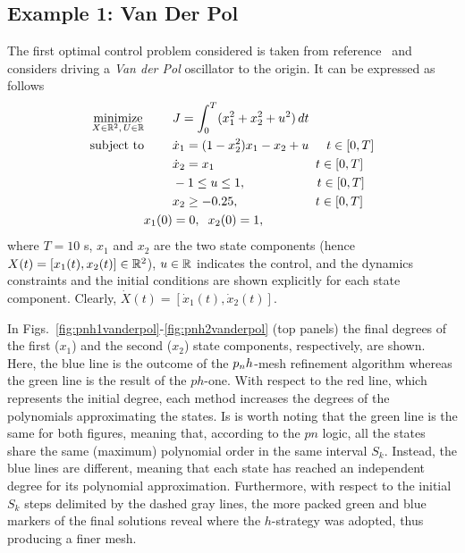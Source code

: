 \subsection*{Example 1: Van Der Pol}
The first optimal control problem considered is taken from reference~\cite{casadi:DOC:2018} and considers
driving a \emph{Van der Pol} oscillator to the origin. It can be expressed as follows
\begin{subequations}\label{eq:vanderpol}
	\begin{align}
	\underset{X \in \mathbb{R}^{2}, \, U \in \mathbb{R}}{\text{minimize}}\hspace{8mm}
	&J = \int_{0}^{T}(x_1^{2} + x_2^{2} + u^{2})\,dt  \label{eq:vancost}\\
	\text{subject to} \hspace{8mm}
	& \dot{x}_1 = (1 - x_2^{2})x_{1} - x_2 + u \hspace{5mm} t \in[0,T] \label{eq:vandyn1}\\
	& \dot{x}_2 = x_1 \hspace{28.5mm} t \in[0,T] \label{eq:vandyn2}\\
	& -1  \leq u \leq 1,  \hspace{20mm} t \in[0,T] \label{eq:vanpath1}\\
	& x_2 \geq -0.25,  \hspace{21.5mm} t \in[0,T] \label{eq:vanpath2}\\
	 x_1(0) &= 0, \hspace{2mm} x_2(0) = 1, \label{eq:initial1}		
	\end{align}
\end{subequations}
where $T = 10$ s, $x_1$ and $x_2$ are the two state components (hence $X(t) = [x_1(t), x_2(t)]\in \mathbb{R}^2$), $u\in\mathbb{R}$ indicates the control, and the dynamics constraints and the initial conditions are shown explicitly for each state component. Clearly, $\dot{X}(t) = [\dot{x}_1(t), \dot{x}_2(t)]$.

In Figs.~\ref{fig:pnh1vanderpol}-\ref{fig:pnh2vanderpol} (top panels) the final degrees of the first ($x_1$) and the second ($x_2$) state components, respectively, are shown. Here, the blue line is the outcome of the $p_{n}h$-mesh refinement algorithm whereas the green line is the result of the $ph$-one. With respect to the red line, which represents the initial degree, each method increases the degrees of the polynomials approximating the states. Is is worth noting that the green line is the same for both figures, meaning that, according to the $pn$ logic, all the states share the same (maximum) polynomial order in the same interval $S_k$. Instead, the blue lines are different, meaning that each state has reached an independent degree for its polynomial approximation.
Furthermore, with respect to the initial $S_k$ steps delimited by the dashed gray lines, the more packed green and blue markers of the final solutions reveal where the $h$-strategy was adopted, thus producing a finer mesh.

